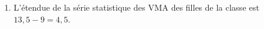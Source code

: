 \begin{enumerate}
%
%

	\begin{enumerate}
		\item %
L'étendue de la série statistique des VMA des filles de la classe est $13,5 - 9 = 4,5$.


\end{enumerate}
\end{enumerate}
